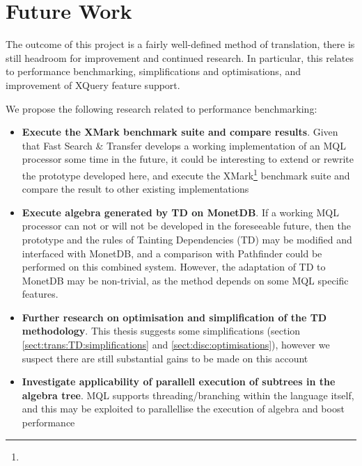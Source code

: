\chapter{Future Work}
\label{chapter:future}

The outcome of this project is a fairly well-defined method of translation,
there is still headroom for improvement and continued research. In particular,
this relates to performance benchmarking, simplifications and optimisations,
and improvement of XQuery feature support.

We propose the following research related to performance benchmarking:
\begin{itemize}
  \item \textbf{Execute the XMark benchmark suite and compare results}. Given that Fast Search \& Transfer
  develops a working implementation of an MQL processor some time in the future, it could be interesting to extend or rewrite the
  prototype developed here, and execute the
  XMark\footnote{} 
  benchmark suite and compare the result to other existing implementations
  \item \textbf{Execute algebra generated by TD on MonetDB}. If a working MQL
  processor can not or will not be developed in the foreseeable future, then
  the prototype and the rules of Tainting Dependencies (TD) may be modified
  and interfaced with MonetDB, and a comparison with Pathfinder could be performed on this
  combined system. However, the adaptation of TD to MonetDB may be non-trivial, as the method depends on some MQL
  specific features.
  \item \textbf{Further research on optimisation and simplification of the TD
  methodology}. This thesis suggests some simplifications (section
  \ref{sect:trans:TD:simplifications} and \ref{sect:disc:optimisations}), however we suspect there are still
  substantial gains to be made on this account
  \item \textbf{Investigate applicability of parallell execution of subtrees in the
  algebra tree}. MQL supports threading/branching within the language itself,
  and this may be exploited to parallellise the execution of algebra and boost
  performance
\end{itemize}

